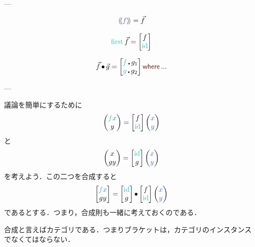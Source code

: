 \documentclass[a5paper,twoside,fleqn,draft]{jsbook}
\begin{document}
---

\begin{equation}
  \mArrowWith{f}=\mArrow{f}
\end{equation}

\begin{equation}
  \mFirst\mArrow{f}=\begin{bmatrix}f\\\mId\end{bmatrix}
\end{equation}

\begin{equation}
  \mArrow{f}\mCompCat\mArrow{g}
  =
  \begin{bmatrix}
    \hFunc{f}\hCompose g_1\\
    \hFunc{g}\hCompose g_2
  \end{bmatrix}
  \mWhere...
\end{equation}

---

議論を簡単にするために
\begin{equation}
  \hPairWith{\hFunc{f}\hVar{x}}{y}
  =\begin{bmatrix}
  f\\
  \mId
  \end{bmatrix}
  \hPairWith{\hVar{x}}{\hVar{y}}
\end{equation}
と
\begin{equation}
  \hPairWith{x}{gy}
  =\begin{bmatrix}
  \mId\\
  g
  \end{bmatrix}
  \hPairWith{\hVar{x}}{\hVar{y}}
\end{equation}
を考えよう．この二つを合成すると
\begin{equation}
  \begin{bmatrix}
    \hFunc{f}\hVar{x}\\
    gy
  \end{bmatrix}
  =
  \begin{bmatrix}
    \mId\\
    g
  \end{bmatrix}
  \mCompCat
  \begin{bmatrix}
    f\\
    \mId
  \end{bmatrix}
  \hPairWith{\hVar{x}}{\hVar{y}}
\end{equation}
であるとする．つまり，合成則も一緒に考えておくのである．

合成と言えばカテゴリである．つまりブラケットは，カテゴリのインスタンス
でなくてはならない．
\end{document}
